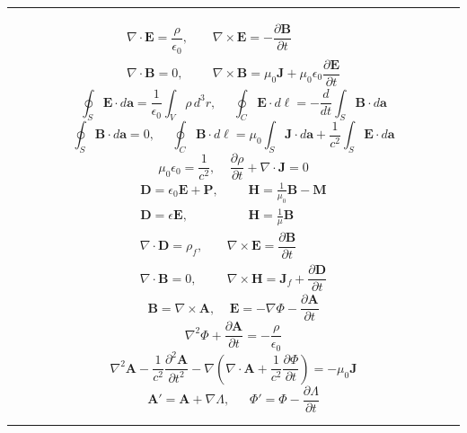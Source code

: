 \documentclass[twocolumn]{article}
\newcommand{\0}{\textcolor{gray}{0}}
\newcommand{\gr}{\nabla}
\newcommand{\di}{\nabla\cdot}
\newcommand{\ro}{\nabla\times}
\newcommand{\la}{\nabla^2}
\newcommand{\eo}{\epsilon_{0}}
\newcommand{\uo}{\mu_{0}}
\newcommand{\pd}[2]{\dfrac{\partial #1}{\partial #2}}
\newcommand{\td}[2]{\dfrac{d #1}{d #2}}
\newcommand{\n}[1]{\mathbf{#1}}
\begin{document}
\vspace{-2mm}\hrule\vspace{1mm}
\begin{equation*}
	\begin{matrix}
		\di\n{E} = \dfrac{\rho}{\eo}, ~~~~~& \ro\n{E} = - \pd{\n{B}}{t}\\
		\di\n{B} = 0, ~~~~~& \ro\n{B} = \uo\n{J} + \uo\eo\pd{\n{E}}{t}
	\end{matrix}
\end{equation*}
\begin{equation*}
	\oint_{S}\n{E}\cdot d\n{a} = \dfrac{1}{\eo}\int_{V}\rho\, d^3 r , ~~~~~~ \oint_{C} \n{E}\cdot d\ell = - \td{}{t} \int_{S}\n{B}\cdot d\n{a}
\end{equation*}
\begin{equation*}
	\oint_{S} \n{B}\cdot d\n{a} = 0, ~~~~~~  \oint_{C} \n{B}\cdot d\ell = \uo\int_{S}\n{J}\cdot d\n{a} + \frac{1}{c^2}\int_{S}\n{E}\cdot d\n{a}
\end{equation*}
\begin{equation*}
	\uo\eo = \frac{1}{c^2}, ~~~~~ \pd{\rho}{t} + \di\n{J} = 0
\end{equation*}
\vspace{-4mm}
\begin{align*}
	\n{D} = \eo\n{E} + \n{P}, ~~~~~~~ &\n{H} = \frac{1}{\uo}\n{B} - \n{M}\\
	\n{D} = \epsilon\n{E}, ~~~~~~~ &\n{H} = \frac{1}{\mu}\n{B}
\end{align*}
\vspace{-6mm}
\begin{align*}
	\di\n{D} = \rho_{f}, ~~~~~& \ro\n{E} = \pd{\n{B}}{t}\\
	\di\n{B} = 0, ~~~~~& \ro\n{H} = \n{J}_{f} + \pd{\n{D}}{t}
\end{align*}
\begin{equation*}
	\n{B} = \ro\n{A}, ~~~~~ \n{E} = -\gr\Phi - \pd{\n{A}}{t}
\end{equation*}
\begin{equation*}
	\la\Phi + \pd{\n{A}}{t} = - \frac{\rho}{\eo}
\end{equation*}
\begin{equation*}
	\la\n{A} - \frac{1}{c^2}\pd{^2\n{A}}{t^2} - \gr\left(\di\n{A} + \frac{1}{c^2} \pd{\Phi}{t}\right) = -\uo\n{J}
\end{equation*}
\begin{equation*}
	\n{A}' = \n{A} + \gr\Lambda, ~~~~~~~ \Phi' = \Phi - \pd{\Lambda}{t}
\end{equation*}
\hrule\vspace{1mm}
\end{document}
